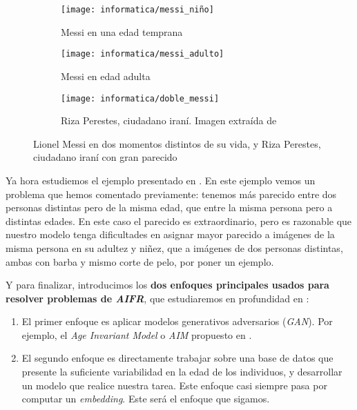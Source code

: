 \begin{figure}[hbtp]
	\centering
	\begin{subfigure}{0.5\textwidth}
		\centering
		\texttt{[image: informatica/messi\_niño]}
		\caption{Messi en una edad temprana}
	\end{subfigure}%
	\begin{subfigure}{.5\textwidth}
		\centering
		\texttt{[image: informatica/messi\_adulto]}
		\caption{Messi en edad adulta}
	\end{subfigure}

	\begin{subfigure}{.8\textwidth}
		\centering
		\texttt{[image: informatica/doble\_messi]}
		\caption{Riza Perestes, ciudadano iraní. Imagen extraída de \cite{informatica:imitador_messi}}
	\end{subfigure}

	\caption{Lionel Messi en dos momentos distintos de su vida, y Riza Perestes, ciudadano iraní con gran parecido}
	\label{img:messi_distintos_otro_adulto}
\end{figure}

Ya hora estudiemos el ejemplo presentado en . En este ejemplo vemos un problema que hemos comentado previamente: tenemos más parecido entre dos personas distintas pero de la misma edad, que entre la misma persona pero a distintas edades. En este caso el parecido es extraordinario, pero es razonable que nuestro modelo tenga dificultades en asignar mayor parecido a imágenes de la misma persona en su adultez y niñez, que a imágenes de dos personas distintas, ambas con barba y mismo corte de pelo, por poner un ejemplo.


Y para finalizar, introducimos los \textbf{dos enfoques principales usados para resolver problemas de \textit{AIFR}}, que estudiaremos en profundidad en :

\begin{enumerate}
	\item El primer enfoque es aplicar modelos generativos adversarios (\textit{GAN}). Por ejemplo, el \textit{Age Invariant Model} o \textit{AIM} propuesto en \cite{informatica:tecnica_sintesis_aifr}.
	\item El segundo enfoque es directamente trabajar sobre una base de datos que presente la suficiente variabilidad en la edad de los individuos, y desarrollar un modelo que realice nuestra tarea. Este enfoque casi siempre pasa por computar un \textit{embedding}. Este será el enfoque que sigamos.
\end{enumerate}

